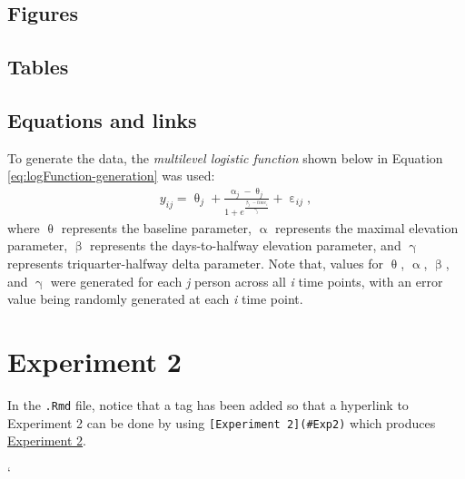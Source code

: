 \documentclass[
12pt, %
twoside,
english]{guelphthesis}
\renewcommand{\theapp}{\Alph{app}} %
\begin{document}
\hypertarget{figures}{%
\section{Figures}\label{figures}}

\hypertarget{tables}{%
\section{Tables}\label{tables}}

\hypertarget{equations-and-links}{%
\section{Equations and links}\label{equations-and-links}}

To generate the data, the \emph{multilevel logistic function} shown below in Equation \eqref{eq:logFunction-generation} was used:
\begin{align}
  y_{ij} = \uptheta_j + \frac{\upalpha_j - \uptheta_j}{{1 + e^\frac{\upbeta_j - time_i}{\upgamma_j}}} + \upepsilon_{ij}, 
\label{eq:logFunction-generation}
\end{align}
\noindent where \(\uptheta\) represents the baseline parameter, \(\upalpha\) represents the maximal elevation parameter, \(\upbeta\) represents the days-to-halfway elevation parameter, and \(\upgamma\) represents triquarter-halfway delta parameter. Note that, values for \(\uptheta\), \(\upalpha\), \(\upbeta\), and \(\upgamma\) were generated for each \emph{j} person across all \emph{i} time points, with an error value being randomly generated at each \emph{i} time point.

\hypertarget{Exp2}{%
\chapter{Experiment 2}\label{Exp2}}

In the \texttt{.Rmd} file, notice that a tag has been added so that a hyperlink to Experiment 2 can be done by using \texttt{{[}Experiment\ 2{]}(\#Exp2)} which produces \protect\hyperlink{Exp2}{Experiment 2}.

\newpage
\renewcommand\bibname{References}
{}
\printbibliography

`

\renewcommand\thefigure{\theapp.\arabic{figure}} %
\end{document}
